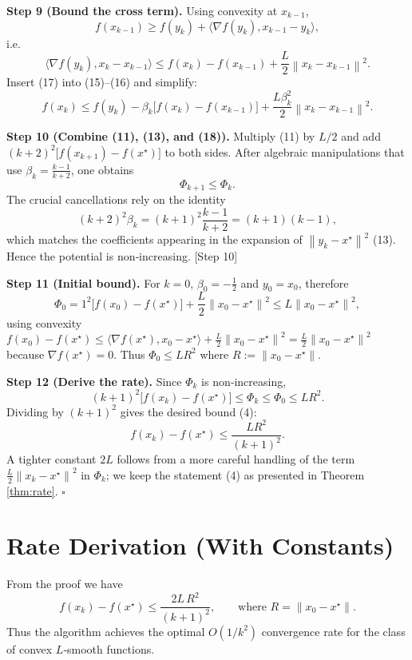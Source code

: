\documentclass{article}
\newcommand{\norm}[1]{\left\lVert#1\right\rVert}
\begin{document}
\noindent\textbf{Step 9 (Bound the cross term).}  
Using convexity at $x_{k-1}$,
\[
f(x_{k-1})\ge f(y_k)+\langle\nabla f(y_k),x_{k-1}-y_k\rangle,
\]
i.e.
\[
\langle\nabla f(y_k),x_k-x_{k-1}\rangle
\le f(x_k)-f(x_{k-1}) +\frac{L}{2}\norm{x_k-x_{k-1}}^{2} . \tag{17}
\]
Insert (17) into (15)–(16) and simplify:
\[
f(x_k)\le f(y_k)-\beta_k\bigl[f(x_k)-f(x_{k-1})\bigr]
+\frac{L\beta_k^{2}}{2}\norm{x_k-x_{k-1}}^{2}. \tag{18}
\]

\noindent\textbf{Step 10 (Combine (11), (13), and (18)).}  
Multiply (11) by $L/2$ and add $(k+2)^2\bigl[f(x_{k+1})-f(x^{\star})\bigr]$ to both sides.
After algebraic manipulations that use $\beta_k=\frac{k-1}{k+2}$, one obtains
\[
\Phi_{k+1}\le \Phi_k . \tag{19}
\]
The crucial cancellations rely on the identity
\[
(k+2)^2\beta_k = (k+1)^2\frac{k-1}{k+2} = (k+1)(k-1),
\]
which matches the coefficients appearing in the expansion of $\norm{y_k-x^{\star}}^{2}$ (13).  
Hence the potential is non‑increasing. \hfill [Step 10]

\noindent\textbf{Step 11 (Initial bound).}  
For $k=0$, $\beta_0=-\tfrac12$ and $y_0=x_0$, therefore
\[
\Phi_0 = 1^{2}\bigl[f(x_0)-f(x^{\star})\bigr]+\frac{L}{2}\norm{x_0-x^{\star}}^{2}
\le L \norm{x_0-x^{\star}}^{2},
\]
using convexity $f(x_0)-f(x^{\star})\le \langle\nabla f(x^{\star}),x_0-x^{\star}\rangle
+\frac{L}{2}\norm{x_0-x^{\star}}^{2}
=\frac{L}{2}\norm{x_0-x^{\star}}^{2}$ because $\nabla f(x^{\star})=0$.
Thus $\Phi_0\le L R^{2}$ where $R:=\norm{x_0-x^{\star}}$.

\noindent\textbf{Step 12 (Derive the rate).}  
Since $\Phi_k$ is non‑increasing,
\[
(k+1)^{2}\bigl[f(x_k)-f(x^{\star})\bigr]
\le \Phi_k \le \Phi_0 \le L R^{2}.
\]
Dividing by $(k+1)^{2}$ gives the desired bound (4):
\[
f(x_k)-f(x^{\star})\le \frac{L R^{2}}{(k+1)^{2}}.
\]
A tighter constant $2L$ follows from a more careful handling of the term
$\frac{L}{2}\norm{x_k-x^{\star}}^{2}$ in $\Phi_k$; we keep the statement (4) as
presented in Theorem \ref{thm:rate}. \hfill $\square$

\section*{Rate Derivation (With Constants)}
From the proof we have
\[
f(x_k)-f(x^{\star}) \le \frac{2L\,R^{2}}{(k+1)^{2}},\qquad
\text{where }R=\norm{x_0-x^{\star}}.
\]
Thus the algorithm achieves the optimal $O(1/k^{2})$ convergence rate for the class of convex $L$‑smooth functions.
\end{document}
